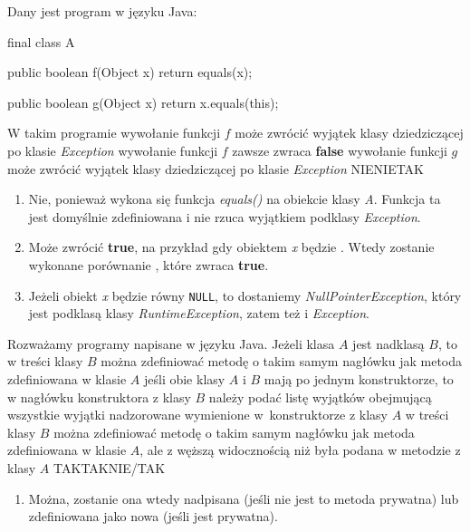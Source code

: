 \begin{solutions}
    \sol Dany jest program w języku Java:
    \begin{java}
        final class A {
        
            public boolean f(Object x) {
                return equals(x);
            }
            
            public boolean g(Object x) {
                return x.equals(this);
            }
        }
    \end{java}
    W takim programie
    \answerss
    {wywołanie funkcji $f$ może zwrócić wyjątek klasy dziedziczącej po klasie \textit{Exception}}
    {wywołanie funkcji $f$ zawsze zwraca \textbf{false}}
    {wywołanie funkcji $g$ może zwrócić wyjątek klasy dziedziczącej po klasie \textit{Exception}}
    {NIE}{NIE}{TAK}

    \begin{enumerate}[\bf A.]
        \item Nie, ponieważ wykona się funkcja \textit{equals()} na obiekcie klasy \textit{A}. Funkcja ta jest domyślnie zdefiniowana i nie rzuca wyjątkiem podklasy \textit{Exception}.

        \item Może zwrócić \textbf{true}, na przykład gdy obiektem \textit{x} będzie . Wtedy zostanie wykonane porównanie , które zwraca \textbf{true}.

        \item Jeżeli obiekt \textit{x} będzie równy \texttt{NULL}, to dostaniemy \textit{NullPointerException}, który jest podklasą klasy \textit{RuntimeException}, zatem też i \textit{Exception}.
    \end{enumerate}

    \sol Rozważamy programy napisane w języku Java. Jeżeli klasa $A$ jest nadklasą $B$, to 
    \answerss
    {w treści klasy $B$ można zdefiniować metodę o takim samym nagłówku jak metoda zdefiniowana w klasie $A$}
    {jeśli obie klasy $A$ i $B$ mają po jednym konstruktorze, to w nagłówku konstruktora z klasy $B$ należy podać listę wyjątków obejmującą wszystkie wyjątki nadzorowane wymienione w~konstruktorze z klasy $A$}
    {w treści klasy $B$ można zdefiniować metodę o takim samym nagłówku jak metoda zdefiniowana w klasie $A$, ale z węższą widocznością niż była podana w metodzie z klasy $A$}
    {TAK}{TAK}{NIE/TAK}

    \begin{enumerate}[\bf A.]
        \item Można, zostanie ona wtedy nadpisana (jeśli nie jest to metoda prywatna) lub zdefiniowana jako nowa (jeśli jest prywatna).


\end{enumerate}
\end{solutions}
